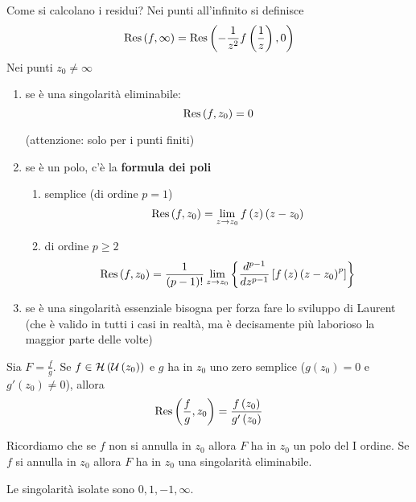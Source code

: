 \begin{rem}
Come si calcolano i residui?
Nei punti all'infinito si definisce
\begin{equation*}
\operatorname{Res} \left(f,\infty \right) = \operatorname{Res} \left(- \frac{1}{z^{2}} f\left(\frac{1}{z}\right) ,0\right)
\end{equation*}
Nei punti $z_{0} \neq \infty $
\begin{enumerate}
\item se è una singolarità eliminabile:
\begin{equation*}
\operatorname{Res} \left(f,z_{0}\right) = 0
\end{equation*}

(attenzione: solo per i punti finiti)
\item se è un polo, c'è la \textbf{formula dei poli}
\begin{enumerate}
\item semplice (di ordine $p = 1$)
\begin{equation*}
\operatorname{Res} \left(f,z_{0}\right) = \lim\limits _{z\rightarrow z_{0}} f\left(z\right)\left(z - z_{0}\right)
\end{equation*}
\item di ordine $p\geq 2$
\begin{equation*}
\operatorname{Res} \left(f,z_{0}\right) = \frac{1}{\left(p - 1\right) !}\lim\limits _{z\rightarrow z_{0}}\left\{\frac{d^{p - 1}}{dz^{p - 1}}\left[ f\left(z\right)\left(z - z_{0}\right)^{p}\right]\right\}
\end{equation*}
\end{enumerate}
\item se è una singolarità essenziale bisogna per forza fare lo sviluppo di Laurent (che è valido in tutti i casi in realtà, ma è decisamente più laborioso la maggior parte delle volte)
\end{enumerate}
\end{rem}
\begin{thm}
Sia $F = \frac{f}{g}$. Se $f\in \mathcal{H} \left(\mathcal{U} \left(z_{0}\right)\right)$ e $g$ ha in $z_{0}$ uno zero semplice ($g\left(z_{0}\right) = 0$ e $g'\left(z_{0}\right) \neq 0$), allora
\begin{equation*}
\operatorname{Res} \left(\frac{f}{g} ,z_{0}\right) = \frac{f\left(z_{0}\right)}{g'\left(z_{0}\right)}
\end{equation*}

Ricordiamo che se $f$ non si annulla in $z_{0}$ allora $F$ ha in $z_{0}$ un polo del I ordine. Se $f$ si annulla in $z_{0}$ allora $F$ ha in $z_{0}$ una singolarità eliminabile.
\end{thm}
Le singolarità isolate sono $0,1, - 1,\infty $.

